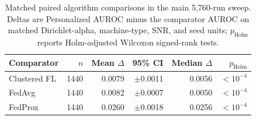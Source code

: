 \begin{table}[t]
\centering
\caption{Matched paired algorithm comparisons in the main 5,760-run sweep. Deltas are Personalized AUROC minus the comparator AUROC on matched Dirichlet-alpha, machine-type, SNR, and seed units; $p_{\mathrm{Holm}}$ reports Holm-adjusted Wilcoxon signed-rank tests.}
\label{tab:p1-algorithm-paired-tests}
\scriptsize
\setlength{\tabcolsep}{2pt}
\begin{tabular}{@{}lrrrrr@{}}
\toprule
Comparator & $n$ & Mean $\Delta$ & 95\% CI & Median $\Delta$ & $p_{\mathrm{Holm}}$ \\
\midrule
Clustered FL & 1440 & 0.0079 & $\pm$0.0011 & 0.0056 & $<10^{-4}$ \\
FedAvg & 1440 & 0.0082 & $\pm$0.0007 & 0.0050 & $<10^{-4}$ \\
FedProx & 1440 & 0.0260 & $\pm$0.0018 & 0.0256 & $<10^{-4}$ \\
\bottomrule
\end{tabular}
\end{table}
